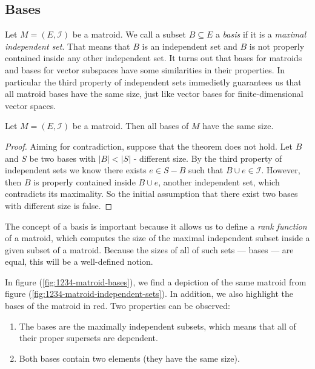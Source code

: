 \subsection{Bases}

Let $M = (E, \mathcal{I})$ be a matroid. We call a subset $B \subseteq E$ a \textit{basis} if it is a \textit{maximal independent set}. That means that $B$ is an independent set and $B$ is not properly contained inside any other independent set. It turns out that bases for matroids and bases for vector subspaces have some similarities in their properties. In particular the third property of independent sets immedietly guarantees us that all matroid bases have the same size, just like vector bases for finite-dimensional vector spaces.

\begin{theorem} \label{thm:bases-have-equal-size}
    Let $M = (E, \mathcal{I})$ be a matroid. Then all bases of $M$ have the same size.
\end{theorem}

\begin{proof}
    Aiming for contradiction, suppose that the theorem does not hold. Let $B$ and $S$ be two bases with $|B| < |S|$ - different size. By the third property of independent sets we know there exists $e \in S - B$ such that $ B \cup e \in \mathcal{I}$. However, then $B$ is properly contained inside $B \cup e$, another independent set, which contradicts its maximality. So the initial assumption that there exist two bases with different size is false.
\end{proof}

The concept of a basis is important because it allows us to define a \textit{rank function} of a matroid, which computes the size of the maximal independent subset inside a given subset of a matroid.  Because the sizes of all of such sets --- bases --- are equal, this will be a well-defined notion.

\begin{exmp}
    In figure (\ref{fig:1234-matroid-bases}), we find a depiction of the same matroid from figure (\ref{fig:1234-matroid-independent-sets}). In addition, we also highlight the bases of the matroid in red. Two properties can be observed:
\begin{enumerate}
    \item The bases are the maximally independent subsets, which means that all of their proper supersets are dependent. 
    \item Both bases contain two elements (they have the same size).
\end{enumerate}
\end{exmp}

